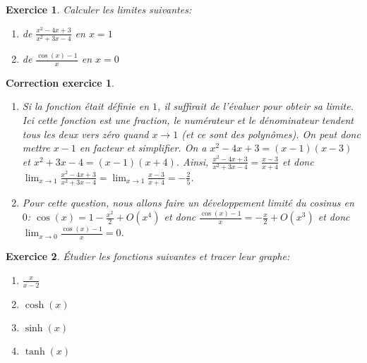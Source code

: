 \documentclass[12pt]{article}
\newtheorem{exercice}{\bf Exercice}
\newtheorem{correction}{\bf Correction exercice}
\newenvironment{exo}{
  \begin{exercice}\normalfont}{\end{exercice}
}
\newenvironment{cor}{
\begin{correction}\smallskip\normalfont}{\end{correction}
}
\newif\ifcorrige\corrigetrue
\begin{document}
\begin{exo} Calculer les limites suivantes:
\begin{multicols}{2}
\begin{enumerate}
\item de $\frac{x^2-4x+3}{x^2+3x-4}$ en $x=1$
\item de $\frac{\cos(x) - 1}{x}$ en $x=0$
\end{enumerate}
\end{multicols}
\end{exo}

\ifcorrige
\color{magenta}
\begin{cor}
$\qquad$
\begin{enumerate}
\item Si la fonction \'etait d\'efinie en $1$, il suffirait de l'\'evaluer pour obteir sa limite.
  Ici cette fonction est une fraction, le num\'erateur et le d\'enominateur tendent tous les deux vers z\'ero
  quand $x \to 1$ (et ce sont des polyn\^omes).
  On peut donc mettre $x-1$ en facteur et simplifier.
  On a $x^2-4x+3 = (x-1)(x-3)$ et $x^2+3x-4 = (x-1)(x+4)$.
  Ainsi, $\frac{x^2-4x+3}{x^2+3x-4} = \frac{x-3}{x+4}$
  et donc $\lim_{x \to 1} \frac{x^2-4x+3}{x^2+3x-4} = \lim_{x \to 1} \frac{x-3}{x+4} = - \frac25$.

\item Pour cette question, nous allons faire un d\'eveloppement limit\'e du cosinus en $0$:
  $\cos(x) = 1 - \frac{x^2}{2} + O(x^4)$ et donc
  $\frac{\cos(x) - 1}{x} = - \frac{x}{2} + O(x^3)$
  et donc $\lim_{x \to 0} \frac{\cos(x)-1}{x} = 0$.
\end{enumerate}
\end{cor}
\color{black}
\fi



\begin{exo} \'Etudier les fonctions suivantes et tracer leur graphe:
\begin{multicols}{4}
\begin{enumerate}
\item $\frac{x}{x-2}$
\item $\cosh(x)$
\item $\sinh(x)$
\item $\tanh(x)$
\end{enumerate}
\end{multicols}
\end{exo}
\end{document}
